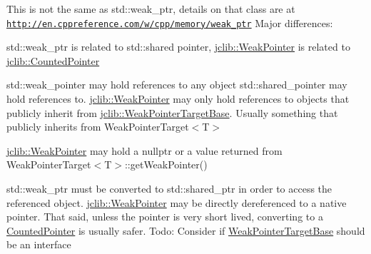 This is not the same as std\+::weak\+\_\+ptr, details on that class are at \href{http://en.cppreference.com/w/cpp/memory/weak_ptr}{\tt http\+://en.\+cppreference.\+com/w/cpp/memory/weak\+\_\+ptr} Major differences\+:
\begin{DoxyItemize}
\item std\+::weak\+\_\+ptr is related to std\+::shared pointer, \hyperlink{classjclib_1_1WeakPointer}{jclib\+::\+Weak\+Pointer} is related to \hyperlink{classjclib_1_1CountedPointer}{jclib\+::\+Counted\+Pointer}
\item std\+::weak\+\_\+pointer may hold references to any object std\+::shared\+\_\+pointer may hold references to. \hyperlink{classjclib_1_1WeakPointer}{jclib\+::\+Weak\+Pointer} may only hold references to objects that publicly inherit from \hyperlink{classjclib_1_1WeakPointerTargetBase}{jclib\+::\+Weak\+Pointer\+Target\+Base}. Usually something that publicly inherits from Weak\+Pointer\+Target$<$\+T$>$
\item \hyperlink{classjclib_1_1WeakPointer}{jclib\+::\+Weak\+Pointer} may hold a nullptr or a value returned from Weak\+Pointer\+Target$<$\+T$>$\+::get\+Weak\+Pointer()
\item std\+::weak\+\_\+ptr must be converted to std\+::shared\+\_\+ptr in order to access the referenced object. \hyperlink{classjclib_1_1WeakPointer}{jclib\+::\+Weak\+Pointer} may be directly dereferenced to a native pointer. That said, unless the pointer is very short lived, converting to a \hyperlink{classjclib_1_1CountedPointer}{Counted\+Pointer} is usually safer. Todo\+: Consider if \hyperlink{classjclib_1_1WeakPointerTargetBase}{Weak\+Pointer\+Target\+Base} should be an interface 
\end{DoxyItemize}